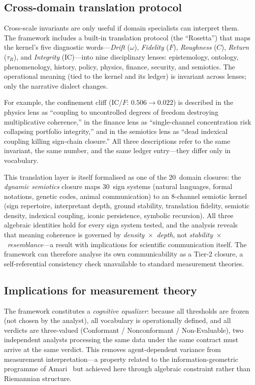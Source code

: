 \documentclass[
  aps,
  prx,
  twocolumn,
  superscriptaddress,
  nofootinbib,
  floatfix
]{revtex4-2}
\newcommand{\tR}{\tau_{\!R}}
\newcommand{\IC}{\mathrm{IC}}
\begin{document}
\subsection{Cross-domain translation protocol}

Cross-scale invariants are only useful if domain specialists
can interpret them. The framework includes a built-in translation
protocol (the ``Rosetta'') that maps the kernel's five diagnostic
words---\emph{Drift} ($\omega$), \emph{Fidelity} ($F$),
\emph{Roughness} ($C$), \emph{Return} ($\tR$), and
\emph{Integrity} ($\IC$)---into nine disciplinary lenses:
epistemology, ontology, phenomenology, history, policy, physics,
finance, security, and semiotics. The operational meaning (tied
to the kernel and its ledger) is invariant across lenses; only
the narrative dialect changes.

For example, the confinement cliff ($\IC/F$: $0.506 \to 0.022$)
is described in the physics lens as ``coupling to uncontrolled
degrees of freedom destroying multiplicative coherence,'' in the
finance lens as ``single-channel concentration risk collapsing
portfolio integrity,'' and in the semiotics lens as ``dead
indexical coupling killing sign-chain closure.'' All three
descriptions refer to the same invariant, the same number, and
the same ledger entry---they differ only in vocabulary.

This translation layer is itself formalised as one of the
20~domain closures: the \emph{dynamic semiotics} closure maps
30~sign systems (natural languages, formal notations, genetic
codes, animal communication) to an 8-channel semiotic kernel
(sign repertoire, interpretant depth, ground stability,
translation fidelity, semiotic density, indexical coupling,
iconic persistence, symbolic recursion). All three algebraic
identities hold for every sign system tested, and the analysis
reveals that meaning coherence is governed by
\emph{density~$\times$~depth}, not
\emph{stability~$\times$~resemblance}---a result
with implications for scientific communication itself. The
framework can therefore analyse its own communicability as a
Tier-2 closure, a self-referential consistency check unavailable
to standard measurement theories.

\subsection{Implications for measurement theory}

The framework constitutes a \emph{cognitive equalizer}: because all
thresholds are frozen (not chosen by the analyst), all vocabulary is
operationally defined, and all verdicts are three-valued
(Conformant / Nonconformant / Non-Evaluable), two independent
analysts processing the same data under the same contract must
arrive at the same verdict. This removes agent-dependent variance
from measurement interpretation---a property related to the
information-geometric programme of Amari~\cite{amari2016information}
but achieved here through algebraic constraint rather than
Riemannian structure.
\end{document}
